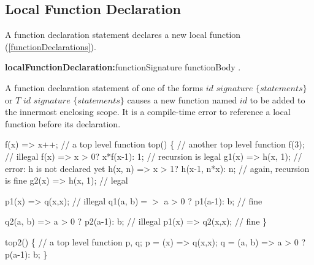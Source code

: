 \documentclass{article}
\begin{document}
\subsection{Local Function Declaration}

\LMHash{}
A function declaration statement declares a new local function (\ref{functionDeclarations}).

\begin{grammar}
{\bf localFunctionDeclaration:}functionSignature functionBody
  .
\end{grammar}

\LMHash{}
A function declaration statement of one of the forms $id$ $signature$ $\{ statements \}$ or $T$ $id$ $signature$ $\{ statements \}$ causes a new function named $id$ to be added to the innermost enclosing scope.
It is a compile-time error to reference a local function before its declaration.


\begin{dartCode}
f(x) => x++; // a top level function
top() \{ // another top level function
  f(3); // illegal
  f(x) => x > 0? x*f(x-1): 1; // recursion is legal
  g1(x) => h(x, 1); // error: h is not declared yet
  h(x, n) => x > 1? h(x-1, n*x): n; // again, recursion is fine
  g2(x) => h(x, 1); // legal

  p1(x) => q(x,x); // illegal
  q1(a, b)$ =>$ a > 0 ? p1(a-1): b; // fine

  q2(a, b) => a > 0 ? p2(a-1): b; // illegal
  p1(x) => q2(x,x); // fine
\}
\end{dartCode}


\begin{dartCode}
top2() \{ // a top level function
  \VAR{} p, q;
  p = (x) => q(x,x);
  q = (a, b) => a > 0 ? p(a-1): b;
\}
\end{dartCode}

\end{document}
